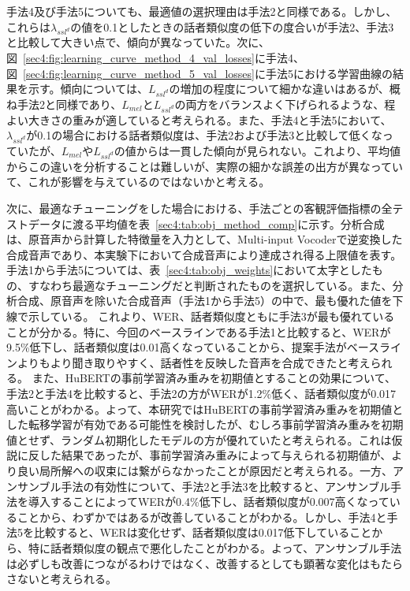 \documentclass[12pt]{jarticle}
\numberwithin{equation}{section}    %
\numberwithin{figure}{section}      %
\numberwithin{table}{section}      %
\begin{document}
手法4及び手法5についても、最適値の選択理由は手法2と同様である。しかし、これらは$\lambda_{ssl^{d}}$の値を0.1としたときの話者類似度の低下の度合いが手法2、手法3と比較して大きい点で、傾向が異なっていた。次に、図~\ref{sec4:fig:learning_curve_method_4_val_losses}に手法4、図~\ref{sec4:fig:learning_curve_method_5_val_losses}に手法5における学習曲線の結果を示す。傾向については、$L_{ssl^{d}}$の増加の程度について細かな違いはあるが、概ね手法2と同様であり、$L_{mel}$と$L_{ssl^{d}}$の両方をバランスよく下げられるような、程よい大きさの重みが適していると考えられる。また、手法4と手法5において、$\lambda_{ssl^{d}}$が0.1の場合における話者類似度は、手法2および手法3と比較して低くなっていたが、$L_{mel}$や$L_{ssl^{d}}$の値からは一貫した傾向が見られない。これより、平均値からこの違いを分析することは難しいが、実際の細かな誤差の出方が異なっていて、これが影響を与えているのではないかと考える。

次に、最適なチューニングをした場合における、手法ごとの客観評価指標の全テストデータに渡る平均値を表~\ref{sec4:tab:obj_method_comp}に示す。分析合成は、原音声から計算した特徴量を入力として、Multi-input Vocoderで逆変換した合成音声であり、本実験下において合成音声により達成され得る上限値を表す。手法1から手法5については、表~\ref{sec4:tab:obj_weights}において太字としたもの、すなわち最適なチューニングだと判断されたものを選択している。また、分析合成、原音声を除いた合成音声（手法1から手法5）の中で、最も優れた値を下線で示している。
これより、WER、話者類似度ともに手法3が最も優れていることが分かる。特に、今回のベースラインである手法1と比較すると、WERが9.5\%低下し、話者類似度は0.01高くなっていることから、提案手法がベースラインよりもより聞き取りやすく、話者性を反映した音声を合成できたと考えられる。
また、HuBERTの事前学習済み重みを初期値とすることの効果について、手法2と手法4を比較すると、手法2の方がWERが1.2\%低く、話者類似度が0.017高いことがわかる。よって、本研究ではHuBERTの事前学習済み重みを初期値とした転移学習が有効である可能性を検討したが、むしろ事前学習済み重みを初期値とせず、ランダム初期化したモデルの方が優れていたと考えられる。これは仮説に反した結果であったが、事前学習済み重みによって与えられる初期値が、より良い局所解への収束には繋がらなかったことが原因だと考えられる。一方、アンサンブル手法の有効性について、手法2と手法3を比較すると、アンサンブル手法を導入することによってWERが0.4\%低下し、話者類似度が0.007高くなっていることから、わずかではあるが改善していることがわかる。しかし、手法4と手法5を比較すると、WERは変化せず、話者類似度は0.017低下していることから、特に話者類似度の観点で悪化したことがわかる。よって、アンサンブル手法は必ずしも改善につながるわけではなく、改善するとしても顕著な変化はもたらさないと考えられる。
\end{document}
